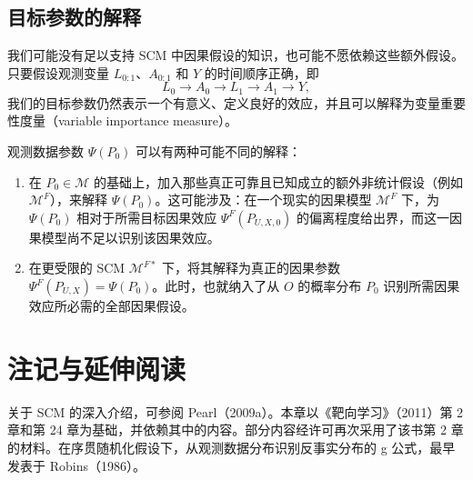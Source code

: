 \subsection{目标参数的解释}
\label{subsec:ch02-interpretation}

我们可能没有足以支持 SCM 中因果假设的知识，也可能不愿依赖这些额外假设。只要假设观测变量 $L_{0:1}$、$A_{0:1}$ 和 $Y$ 的时间顺序正确，即
\[
 L_0\to A_0\to L_1\to A_1\to Y,
\]
我们的目标参数仍然表示一个有意义、定义良好的效应，并且可以解释为变量重要性度量（variable importance measure）。

\begin{sourcebox}
观测数据参数 $\Psi(P_0)$ 可以有两种可能不同的解释：
\begin{enumerate}
 \item 在 $P_0\in\mathcal M$ 的基础上，加入那些真正可靠且已知成立的额外非统计假设（例如 $\mathcal M^F$），来解释 $\Psi(P_0)$。这可能涉及：在一个现实的因果模型 $\mathcal M^F$ 下，为 $\Psi(P_0)$ 相对于所需目标因果效应 $\Psi^F(P_{U,X,0})$ 的偏离程度给出界，而这一因果模型尚不足以识别该因果效应。
 \item 在更受限的 SCM $\mathcal M^{F*}$ 下，将其解释为真正的因果参数 $\Psi^F(P_{U,X})=\Psi(P_0)$。此时，也就纳入了从 $O$ 的概率分布 $P_0$ 识别所需因果效应所必需的全部因果假设。
\end{enumerate}
\end{sourcebox}

\section{注记与延伸阅读}
\label{sec:ch02-notes}

关于 SCM 的深入介绍，可参阅 Pearl（2009a）。本章以《靶向学习》（2011）第 2 章和第 24 章为基础，并依赖其中的内容。部分内容经许可再次采用了该书第 2 章的材料。在序贯随机化假设下，从观测数据分布识别反事实分布的 g 公式，最早发表于 Robins（1986）。
